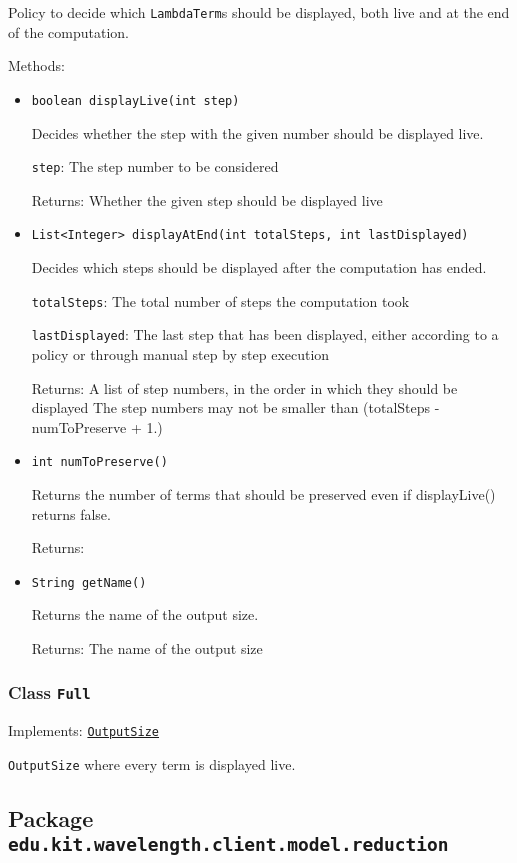 Policy to decide which \texttt{LambdaTerm}s should be displayed,
 both live and at the end of the computation.

Methods:
\begin{itemize}
\item \texttt{boolean displayLive(int step)}

Decides whether the step with the given number should be displayed live.

\texttt{step}: The step number to be considered

Returns: Whether the given step should be displayed live

\item \texttt{List<Integer> displayAtEnd(int totalSteps, int lastDisplayed)}

Decides which steps should be displayed after the computation has ended.

\texttt{totalSteps}: The total number of steps the computation took

\texttt{lastDisplayed}: The last step that has been displayed, either
 according to a policy or through manual step by step execution

Returns: A list of step numbers, in the order in which they should be displayed
 The step numbers may not be smaller than (totalSteps - numToPreserve + 1.)

\item \texttt{int numToPreserve()}

Returns the number of terms that should be preserved even if displayLive()
 returns false.

Returns: 

\item \texttt{String getName()}

Returns the name of the output size.

Returns: The name of the output size

\end{itemize}

\subsubsection{Class \texttt{Full}}
\label{type:edu.kit.wavelength.client.model.output.Full}
Implements: \texttt{\hyperref[type:edu.kit.wavelength.client.model.output.OutputSize]{OutputSize}}

\texttt{OutputSize} where every term is displayed live.

\subsection{Package \lstinline{edu.kit.wavelength.client.model.reduction}}
\label{pkg:edu.kit.wavelength.client.model.reduction}


